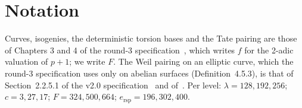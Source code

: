\documentclass[version=preprint,notanonymous]{iacrcc}
\newcommand{\ers}{e_{\mathrm{rsp}}}
\begin{document}
\section{Notation}
\label{sec:notation}

Curves, isogenies, the deterministic torsion bases and the Tate pairing
are those of Chapters 3 and 4 of the round-3
specification~\cite{sqisign-spec-r3}, which writes $f$ for the 2-adic
valuation of $p + 1$; we write $F$. The Weil pairing on an elliptic curve,
which the round-3 specification uses only on abelian surfaces
(Definition~4.5.3), is that of Section~2.2.5.1 of the v2.0
specification~\cite{sqisign-spec-r2} and of~\cite[III.8]{silverman}. Per
level: $\lambda = 128, 192, 256$; $c = 3, 27, 17$; $F = 324, 500, 664$;
$\ers = 196, 302, 400$.
\end{document}
